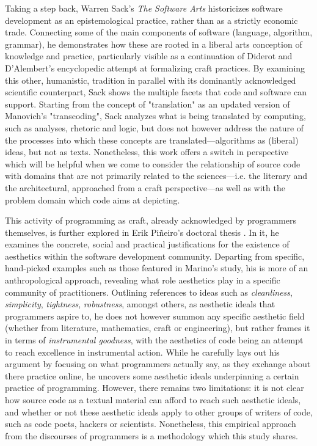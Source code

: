 Taking a step back, Warren Sack's \emph{The Software Arts} \citep{sack_software_2019} historicizes software development as an epistemological practice, rather than as a strictly economic trade. Connecting some of the main components of software (language, algorithm, grammar), he demonstrates how these are rooted in a liberal arts conception of knowledge and practice, particularly visible as a continuation of Diderot and D'Alembert's encyclopedic attempt at formalizing craft practices. By examining this other, humanistic, tradition in parallel with its dominantly acknowledged scientific counterpart, Sack shows the multiple facets that code and software can support. Starting from the concept of "translation" as an updated version of Manovich's "transcoding", Sack analyzes what is being translated by computing, such as analyses, rhetoric and logic, but does not however address the nature of the processes into which these concepts are translated—algorithms as (liberal) ideas, but not as texts. Nonetheless, this work offers a switch in perspective which will be helpful when we come to consider the relationship of source code with domains that are not primarily related to the sciences—i.e. the literary and the architectural, approached from a craft perspective—as well as with the problem domain which code aims at depicting.

This activity of programming as craft, already acknowledged by programmers themselves, is further explored in Erik Piñeiro's doctoral thesis \citep{pineiro_aesthetics_2003}. In it, he examines the concrete, social and practical justifications for the existence of aesthetics within the software development community. Departing from specific, hand-picked examples such as those featured in Marino's study, his is more of an anthropological approach, revealing what role aesthetics play in a specific community of practitioners. Outlining references to ideas such as \emph{cleanliness}, \emph{simplicity}, \emph{tightness}, \emph{robustness}, amongst others, as aesthetic ideals that programmers aspire to, he does not however summon any specific aesthetic field (whether from literature, mathematics, craft or engineering), but rather frames it in terms of \emph{instrumental goodness}, with the aesthetics of code being an attempt to reach excellence in instrumental action. While he carefully lays out his argument by focusing on what programmers actually say, as they exchange about there practice online, he uncovers some aesthetic ideals underpinning a certain practice of programming. However, there remains two limitations: it is not clear how source code as a textual material can afford to reach such aesthetic ideals, and whether or not these aesthetic ideals apply to other groups of writers of code, such as code poets, hackers or scientists. Nonetheless, this empirical approach from the discourses of programmers is a methodology which this study shares.

